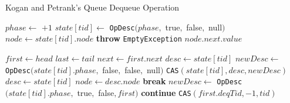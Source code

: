 \begin{algorithm}[!ht]
    \centering
    \captionsetup{justification=centering}
    \caption{Kogan and Petrank's Queue Dequeue Operation \cite{Kogan2011WaitFreeQueues}}
    \label{alg:kogan-petrank-dequeue}
    \scriptsize
    \begin{algorithmic}[1]
            \State $phase \gets$  $+ 1$
            \State $state[tid] \gets$ \texttt{OpDesc}$(phase,$ true$,$ false$,$ null$)$
            \State {}
            \State {}
            \State $node \gets state[tid].node$
                \State \textbf{throw} \texttt{EmptyException}
            \EndIf
            \State \Return $node.next.value$
        \EndFunction
        
        \State
        
                \State $first \gets head$
                \State $last \gets tail$
                \State $next \gets first.next$
                 
                     
                         
                            \State $desc \gets state[tid]$
                                \State $newDesc \gets$ \texttt{OpDesc}$(state[tid].phase,$ false$,$ false$,$ null$)$
                                \State \texttt{CAS}$(state[tid], desc, newDesc)$
                            \EndIf
                        \Else
                            \State {} 
                        \EndIf
                    \Else {}
                        \State $desc \gets state[tid]$
                        \State $node \gets desc.node$
                            \State \textbf{break}
                        \EndIf
                            \State $newDesc \gets$ \texttt{OpDesc}$(state[tid].phase,$ true$,$ false$, first)$
                                \State \textbf{continue}
                            \EndIf
                        \EndIf
                        \State \texttt{CAS}$(first.deqTid, -1, tid)$ 
                        \State {}
                    \EndIf
                \EndIf
            \EndWhile
        \EndProcedure
    \end{algorithmic}
\end{algorithm}

